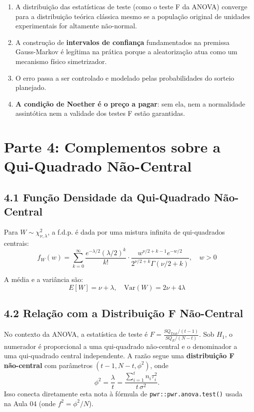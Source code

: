 \documentclass[
]{article}
\providecommand{\tightlist}{%
  \setlength{\itemsep}{0pt}\setlength{\parskip}{0pt}}
\begin{document}
\begin{enumerate}
\def\labelenumi{\arabic{enumi}.}
\tightlist
\item
  A distribuição das estatísticas de teste (como o teste F da ANOVA)
  converge para a distribuição teórica clássica mesmo se a população
  original de unidades experimentais for altamente não-normal.
\item
  A construção de \textbf{intervalos de confiança} fundamentados na
  premissa Gauss-Markov é legítima na prática porque a aleatorização
  atua como um mecanismo físico simetrizador.
\item
  O erro passa a ser controlado e modelado pelas probabilidades do
  sorteio planejado.
\item
  \textbf{A condição de Noether é o preço a pagar}: sem ela, nem a
  normalidade assintótica nem a validade dos testes F estão garantidas.
\end{enumerate}

\section{Parte 4: Complementos sobre a Qui-Quadrado
Não-Central}\label{parte-4-complementos-sobre-a-qui-quadrado-nuxe3o-central}

\subsection{4.1 Função Densidade da Qui-Quadrado
Não-Central}\label{funuxe7uxe3o-densidade-da-qui-quadrado-nuxe3o-central}

Para \(W \sim \chi^2_{\nu, \lambda}\), a f.d.p. é dada por uma mistura
infinita de qui-quadrados centrais:
\[f_W(w) = \sum_{k=0}^{\infty} \frac{e^{-\lambda/2} (\lambda/2)^k}{k!} \cdot \frac{w^{\nu/2 + k - 1} e^{-w/2}}{2^{\nu/2 + k} \Gamma(\nu/2 + k)}, \quad w > 0\]

A média e a variância são:
\[E[W] = \nu + \lambda, \quad \mathrm{Var}(W) = 2\nu + 4\lambda\]

\subsection{4.2 Relação com a Distribuição F
Não-Central}\label{relauxe7uxe3o-com-a-distribuiuxe7uxe3o-f-nuxe3o-central}

No contexto da ANOVA, a estatística de teste é
\(F = \frac{SQ_{\text{Trat}}/(t-1)}{SQ_E/(N-t)}\). Sob \(H_1\), o
numerador é proporcional a uma qui-quadrado não-central e o denominador
a uma qui-quadrado central independente. A razão segue uma
\textbf{distribuição F não-central} com parâmetros
\((t-1, N-t, \phi^2)\), onde
\[\phi^2 = \frac{\lambda}{t} = \frac{\sum_{i=1}^{t} n_i \tau_i^2}{t\,\sigma^2}.\]
Isso conecta diretamente esta nota à fórmula de
\texttt{pwr::pwr.anova.test()} usada na Aula 04 (onde
\(f^2 = \phi^2 / N\)).
\end{document}
